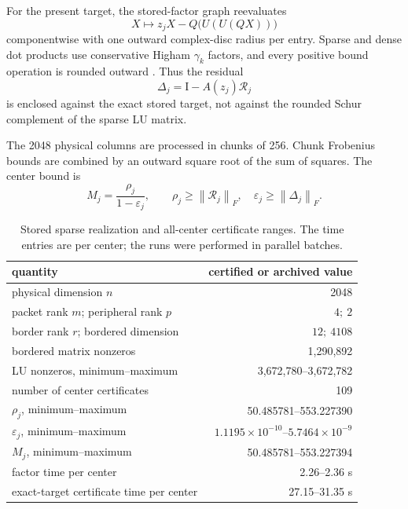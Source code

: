 \documentclass[11pt]{article}
\theoremstyle{definition}
\theoremstyle{remark}
\newcommand{\Id}{\mathrm I}
\newcommand{\norm}[1]{\left\lVert#1\right\rVert}
\newcommand{\Rapp}{\mathcal R}
\begin{document}
For the present target, the stored-factor graph reevaluates
\begin{equation}
 X\longmapsto z_jX-Q\bigl(U(U(QX))\bigr)
 \label{eq:exact-target-action}
\end{equation}
componentwise with one outward complex-disc radius per entry.  Sparse and
dense dot products use conservative Higham $\gamma_k$ factors, and every
positive bound operation is rounded outward
\citep{Higham2002,Rump2010}.  Thus the residual
\begin{equation}
 \Delta_j=\Id-A(z_j)\Rapp_j
 \label{eq:center-residual}
\end{equation}
is enclosed against the exact stored target, not against the rounded Schur
complement of the sparse LU matrix.

The 2048 physical columns are processed in chunks of 256.  Chunk Frobenius
bounds are combined by an outward square root of the sum of squares.  The
center bound is
\begin{equation}
 M_j=\frac{\rho_j}{1-\varepsilon_j},\qquad
 \rho_j\geq\norm{\Rapp_j}_F,\quad
 \varepsilon_j\geq\norm{\Delta_j}_F.
 \label{eq:center-bound}
\end{equation}

\begin{table}[H]
\centering
\caption{Stored sparse realization and all-center certificate ranges.  The
time entries are per center; the runs were performed in parallel batches.}
\label{tab:center-certificates}
\begin{tabular}{lr}
\toprule
quantity & certified or archived value\\
\midrule
physical dimension $n$ & 2048\\
packet rank $m$; peripheral rank $p$ & $4;\ 2$\\
border rank $r$; bordered dimension & $12;\ 4108$\\
bordered matrix nonzeros & 1,290,892\\
LU nonzeros, minimum--maximum & 3,672,780--3,672,782\\
number of center certificates & 109\\
$\rho_j$, minimum--maximum & 50.485781--553.227390\\
$\varepsilon_j$, minimum--maximum
 & $1.1195\times10^{-10}$--$5.7464\times10^{-9}$\\
$M_j$, minimum--maximum & 50.485781--553.227394\\
factor time per center & 2.26--2.36 s\\
exact-target certificate time per center & 27.15--31.35 s\\
\bottomrule
\end{tabular}
\end{table}
\end{document}
